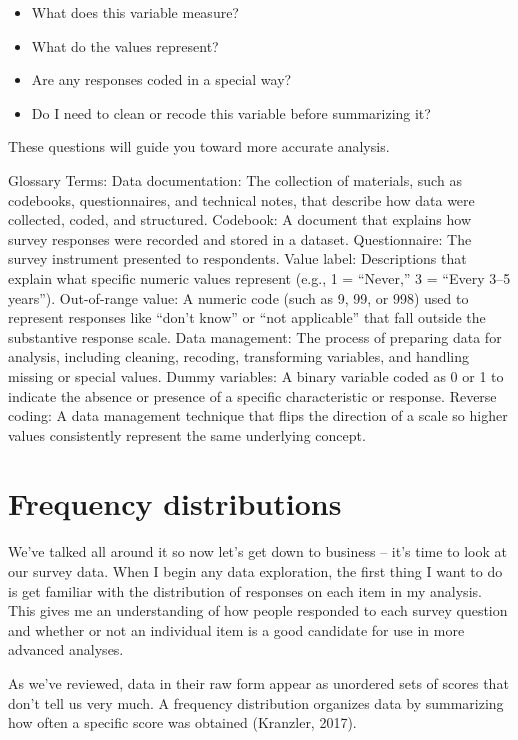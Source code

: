 \documentclass[
  letterpaper,
  DIV=11,
  numbers=noendperiod]{scrreprt}
\providecommand{\tightlist}{%
  \setlength{\itemsep}{0pt}\setlength{\parskip}{0pt}}
\begin{document}
\begin{itemize}
\tightlist
\item
  What does this variable measure?
\item
  What do the values represent?
\item
  Are any responses coded in a special way?
\item
  Do I need to clean or recode this variable before summarizing it?
\end{itemize}

These questions will guide you toward more accurate analysis.

Glossary Terms: Data documentation: The collection of materials, such as
codebooks, questionnaires, and technical notes, that describe how data
were collected, coded, and structured. Codebook: A document that
explains how survey responses were recorded and stored in a dataset.
Questionnaire: The survey instrument presented to respondents. Value
label: Descriptions that explain what specific numeric values represent
(e.g., 1 = ``Never,'' 3 = ``Every 3--5 years''). Out-of-range value: A
numeric code (such as 9, 99, or 998) used to represent responses like
``don't know'' or ``not applicable'' that fall outside the substantive
response scale. Data management: The process of preparing data for
analysis, including cleaning, recoding, transforming variables, and
handling missing or special values. Dummy variables: A binary variable
coded as 0 or 1 to indicate the absence or presence of a specific
characteristic or response. Reverse coding: A data management technique
that flips the direction of a scale so higher values consistently
represent the same underlying concept.

\section{Frequency distributions}\label{frequency-distributions}

We've talked all around it so now let's get down to business -- it's
time to look at our survey data. When I begin any data exploration, the
first thing I want to do is get familiar with the distribution of
responses on each item in my analysis. This gives me an understanding of
how people responded to each survey question and whether or not an
individual item is a good candidate for use in more advanced analyses.

As we've reviewed, data in their raw form appear as unordered sets of
scores that don't tell us very much. A frequency distribution organizes
data by summarizing how often a specific score was obtained (Kranzler,
2017).
\end{document}

